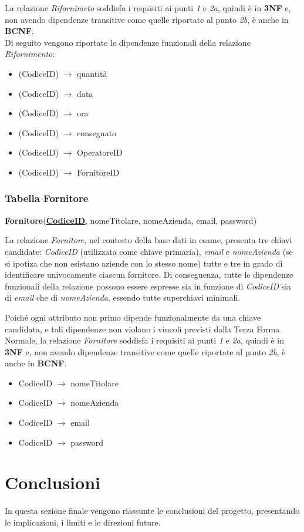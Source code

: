\documentclass[12pt,a4paper]{article}
\begin{document}
    \noindent
    La relazione \textit{Rifornimeto} soddisfa i requisiti ai punti \textit{1} e \textit{2a}, quindi è in \textbf{3NF} e, non avendo dipendenze transitive come quelle riportate al punto \textit{2b}, è anche in \textbf{BCNF}.\\
    Di seguito vengono riportate le dipendenze funzionali della relazione \textit{Rifornimento}:
    \begin{itemize}[leftmargin=1em, label=$\circ$]
        \item (CodiceID) $\rightarrow$ quantità
        \item (CodiceID) $\rightarrow$ data
        \item (CodiceID) $\rightarrow$ ora
        \item (CodiceID) $\rightarrow$ consegnato
        \item (CodiceID) $\rightarrow$ OperatoreID
        \item (CodiceID) $\rightarrow$ FornitoreID
    \end{itemize}


    \subsubsection*{Tabella Fornitore}
    \begin{tcolorbox}[
        colback=gray!8,
        colframe=black!30,
        title=
    ]
        \textbf{Fornitore}(\textbf{\uline{CodiceID}}, nomeTitolare, nomeAzienda, email, password) 
    \end{tcolorbox}
    
    \noindent
    La relazione \textit{Fornitore}, nel contesto della base dati in esame, presenta tre chiavi candidate: \textit{CodiceID} (utilizzata come chiave primaria), \textit{email} e \textit{nomeAzienda} (se si ipotiza che non esistano aziende con lo stesso nome) tutte e tre in grado di identificare univocamente ciascun fornitore. Di conseguenza, tutte le dipendenze funzionali della relazione possono essere espresse sia in funzione di \textit{CodiceID} sia di \textit{email} che di \textit{nomeAzienda}, essendo tutte superchiavi minimali.

    \vspace{8pt}
    \noindent
    Poiché ogni attributo non primo dipende funzionalmente da una chiave candidata, e tali dipendenze non violano i vincoli previsti dalla Terza Forma Normale, la relazione \textit{Fornitore} soddisfa i requisiti ai punti \textit{1} e \textit{2a}, quindi è in \textbf{3NF} e, non avendo dipendenze transitive come quelle riportate al punto \textit{2b}, è anche in \textbf{BCNF}.
    \begin{itemize}[leftmargin=1em, label=$\circ$]
        \item CodiceID $\rightarrow$ nomeTitolare
        \item CodiceID $\rightarrow$ nomeAzienda
        \item CodiceID $\rightarrow$ email
        \item CodiceID $\rightarrow$ password
    \end{itemize}
    

    \newpage
    \section{Conclusioni}
    In questa sezione finale vengono riassunte le conclusioni del progetto, presentando le implicazioni, i limiti e le direzioni future.
\end{document}
